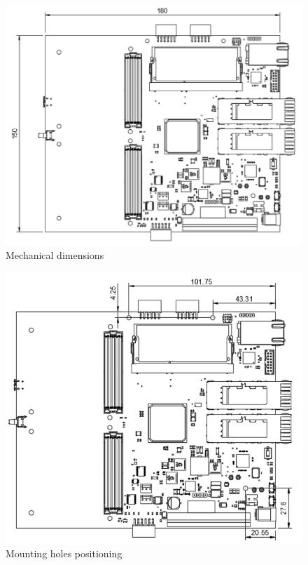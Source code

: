 \documentclass[12pt,oneside,a4]{article}
\begin{document}
\begin{figure}[H]
\begin{center}
\includegraphics[width=1\linewidth]{mechanical.png}
 \caption{Mechanical dimensions}\label{mechanical}
\end{center}
\end{figure}

\begin{figure}[H]
\begin{center}
\includegraphics[width=1\linewidth]{holes.png}
 \caption{Mounting holes positioning}\label{holes}
\end{center}
\end{figure}
\end{document}
